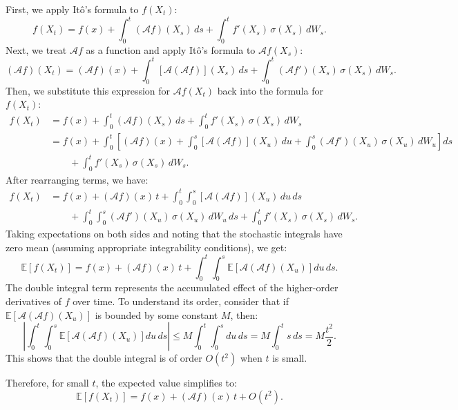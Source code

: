 \documentclass{article}[11]
\begin{document}
First, we apply It\^{o}'s formula to \( f(X_t) \):
\[
f(X_t) = f(x) + \int_0^t (\mathcal{A} f)(X_s)\, ds + \int_0^t f'(X_s)\, \sigma(X_s)\, dW_s.
\]
Next, we treat \( \mathcal{A} f \) as a function and apply It\^{o}'s formula to \( \mathcal{A} f(X_s) \):
\[
(\mathcal{A} f)(X_t) = (\mathcal{A} f)(x) + \int_0^t [\mathcal{A} (\mathcal{A} f)](X_s)\, ds + \int_0^t (\mathcal{A} f')(X_s)\, \sigma(X_s)\, dW_s.
\]
Then, we substitute this expression for \( \mathcal{A} f(X_t) \) back into the formula for \( f(X_t) \):
\[
\begin{aligned}
	f(X_t) &= f(x) + \int_0^t (\mathcal{A} f)(X_s)\, ds + \int_0^t f'(X_s)\, \sigma(X_s)\, dW_s \\
	&= f(x) + \int_0^t \left[ (\mathcal{A} f)(x) + \int_0^s [\mathcal{A} (\mathcal{A} f)](X_u)\, du + \int_0^s (\mathcal{A} f')(X_u)\, \sigma(X_u)\, dW_u \right] ds \\
	&\qquad + \int_0^t f'(X_s)\, \sigma(X_s)\, dW_s.
\end{aligned}
\]
After rearranging terms, we have:
\[
\begin{aligned}
	f(X_t) &= f(x) + (\mathcal{A} f)(x)\, t + \int_0^t \int_0^s [\mathcal{A} (\mathcal{A} f)](X_u)\, du\, ds \\
	&\qquad + \int_0^t \int_0^s (\mathcal{A} f')(X_u)\, \sigma(X_u)\, dW_u\, ds + \int_0^t f'(X_s)\, \sigma(X_s)\, dW_s.
\end{aligned}
\]
Taking expectations on both sides and noting that the stochastic integrals have zero mean (assuming appropriate integrability conditions), we get:
\[
\mathbb{E}[f(X_t)] = f(x) + (\mathcal{A} f)(x)\, t + \int_0^t \int_0^s \mathbb{E}\left[ \mathcal{A} (\mathcal{A} f)(X_u) \right] du\, ds.
\]
The double integral term represents the accumulated effect of the higher-order derivatives of \( f \) over time. To understand its order, consider that if \( \mathbb{E}\left[ \mathcal{A} (\mathcal{A} f)(X_u) \right] \) is bounded by some constant \( M \), then:
\[
\left| \int_0^t \int_0^s \mathbb{E}\left[ \mathcal{A} (\mathcal{A} f)(X_u) \right] du\, ds \right| \leq M \int_0^t \int_0^s du\, ds = M \int_0^t s\, ds = M \frac{t^2}{2}.
\]
This shows that the double integral is of order \( O(t^2) \) when \( t \) is small.

Therefore, for small \( t \), the expected value simplifies to:
\begin{equation}\label{expansion_ot2}
	\mathbb{E}[f(X_t)] = f(x) + (\mathcal{A} f)(x)\, t + O(t^2).
\end{equation}
\end{document}

